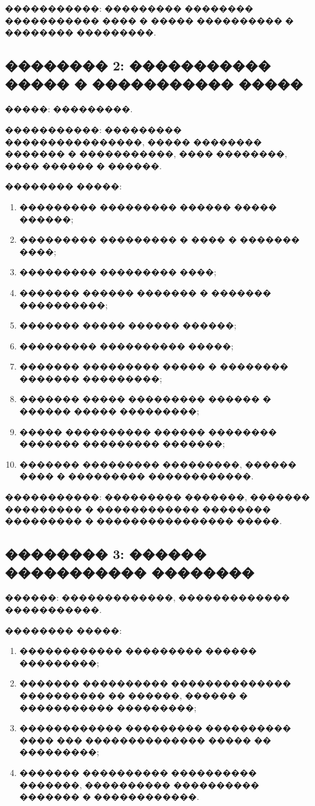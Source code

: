 �����������: ��������� �������� ����������� ���� � ����� ���������� � �������� ���������.

\subsection{�������� 2: ����������� ����� � ����������� �����}

�����: ���������.

�����������: ��������� ����������������, ����� �������� ������� � �����������, ���� ��������, ���� ������ � ������.

�������� �����:
\begin{enumerate}
  \item ��������� ��������� ������ ����� ������;
  \item ��������� ��������� � ���� � ������� ����;
  \item ��������� ��������� ����;
  \item ������� ������ ������� � ������� ����������;
  \item ������� ����� ������ ������;
  \item ��������� ���������� �����;
  \item ������� ��������� ����� � �������� ������� ���������;
  \item ������� ����� ��������� ������ � ������ ����� ���������;
  \item ����� ���������� ������ �������� ������� ��������� �������;
  \item ������� ��������� ���������, ������ ���� � ��������� ������������.
\end{enumerate}

�����������: ��������� �������, ������� ��������� � ������������ �������� ��������� � ���������������� �����.

\subsection{�������� 3: ������ ����������� ��������}

������: �������������, ������������� �����������.

�������� �����:
\begin{enumerate}
  \item ������������ ��������� ������ ���������;
  \item ������� ���������� �������������� ���������� �� ������, ������ � ����������� ���������;
  \item ������������ ��������� ���������� ���� ��� �������������� ����� �� ���������;
  \item ������� ���������� ���������� �������, ���������� ���������� ������� � ������������.
\end{enumerate}

